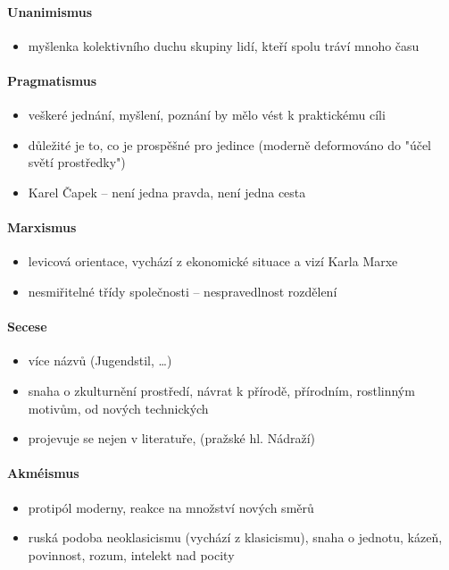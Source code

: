 \paragraph{Unanimismus}
\begin{itemize}
\item myšlenka kolektivního duchu skupiny lidí, kteří spolu tráví mnoho času
\end{itemize}

\paragraph{Pragmatismus}
\begin{itemize}
\item veškeré jednání, myšlení, poznání by mělo vést k praktickému cíli
\item důležité je to, co je prospěšné pro jedince (moderně deformováno do "účel světí prostředky")
\item Karel Čapek -- není jedna pravda, není jedna cesta
\end{itemize}

\paragraph{Marxismus}
\begin{itemize}
\item levicová orientace, vychází z ekonomické situace a vizí Karla Marxe
\item nesmiřitelné třídy společnosti -- nespravedlnost rozdělení
\end{itemize}

\paragraph{Secese}
\begin{itemize}
\item více názvů (Jugendstil, \ldots)
\item snaha o zkulturnění prostředí, návrat k přírodě, přírodním, rostlinným motivům, od nových technických
\item projevuje se nejen v literatuře, (pražské hl. Nádraží)
\end{itemize}

\paragraph{Akméismus}
\begin{itemize}
\item protipól moderny, reakce na množství nových směrů
\item ruská podoba neoklasicismu (vychází z klasicismu), snaha o jednotu, kázeň, povinnost, rozum, intelekt nad pocity
\end{itemize}

